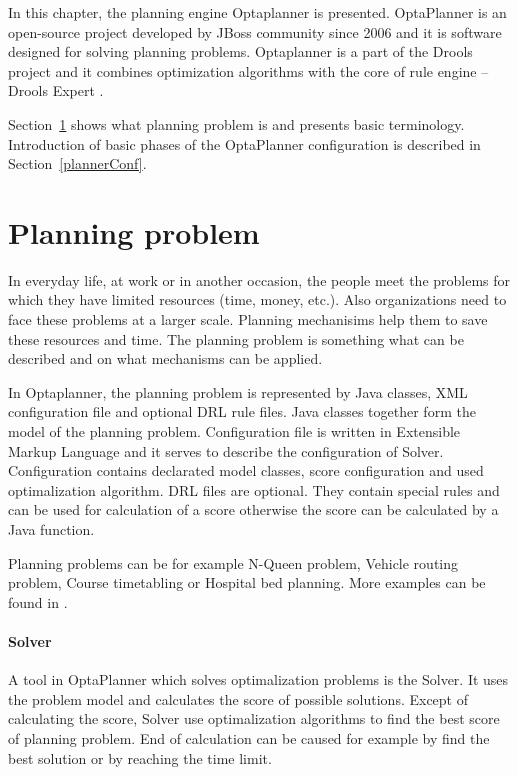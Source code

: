 In this chapter, the planning engine Optaplanner is presented. OptaPlanner \cite{OptaPlannerPages, DroolsBook} is an open-source project developed by JBoss community since 2006 and it is software designed for solving planning problems. Optaplanner is a part of the Drools project \cite{Drools} and it combines optimization algorithms with the core of rule engine -- Drools Expert \cite{Drools}.

Section~\ref{planningProblem} shows what planning problem is and presents basic terminology. Introduction of basic phases of the OptaPlanner configuration is described in Section~\ref{plannerConf}. 

\section{Planning problem}\label{planningProblem}
In everyday life, at work or in another occasion, the people meet the problems for which they have limited resources (time, money, etc.). Also organizations need to face these problems at a larger scale. Planning mechanisims help them to save these resources and time. The planning problem is something what can be described and on what mechanisms can be applied.

In Optaplanner, the planning problem is represented by Java classes, XML configuration file and optional DRL rule files. Java classes together form the model of the planning problem. Configuration file is written in Extensible Markup Language and it serves to describe the configuration of Solver. Configuration contains declarated model classes, score configuration and used optimalization algorithm. DRL files are optional. They contain special rules and can be used for calculation of a score otherwise the score can be calculated by a Java function.

Planning problems can be for example N-Queen problem, Vehicle routing problem, Course timetabling or Hospital bed planning. More examples can be found in \cite{OptaPlannerDoc}.

\paragraph{Solver}
A tool in OptaPlanner which solves optimalization problems is the Solver. It uses the problem model and calculates the score of possible solutions. Except of calculating the score, Solver use optimalization algorithms to find the best score of planning problem. End of calculation can be caused for example by find the best solution or by reaching the time limit.

